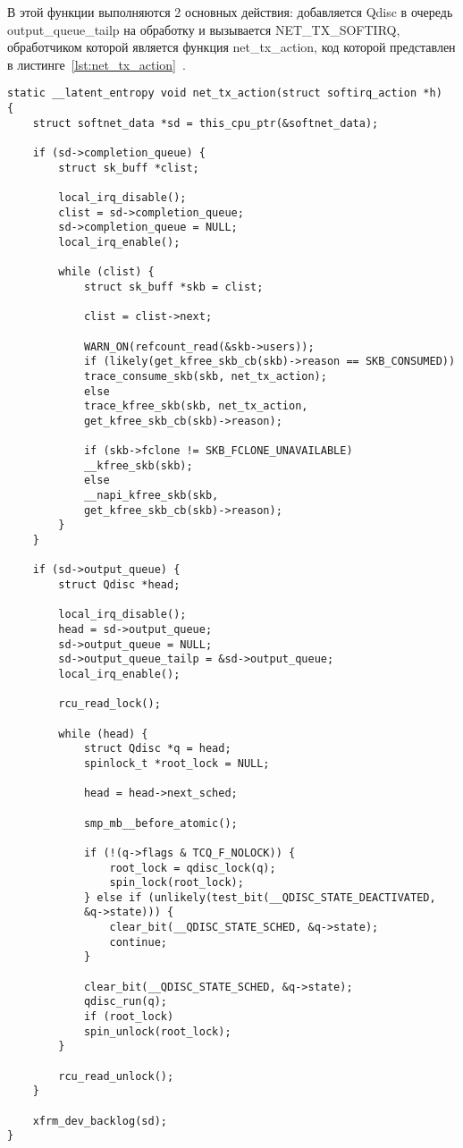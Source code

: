 В этой функции выполняются 2 основных действия: добавляется Qdisc в очередь output\_queue\_tailp на обработку и вызывается NET\_TX\_SOFTIRQ, обработчиком которой является функция net\_tx\_action, код которой представлен в листинге~\ref{lst:net_tx_action}~\cite{net_tx_action}.
\begin{center}
	\captionsetup{justification=raggedright,singlelinecheck=off}
	\begin{lstlisting}[label=lst:net_tx_action,caption=Функция net\_tx\_action,showstringspaces=false]
static __latent_entropy void net_tx_action(struct softirq_action *h)
{
	struct softnet_data *sd = this_cpu_ptr(&softnet_data);
	
	if (sd->completion_queue) {
		struct sk_buff *clist;
		
		local_irq_disable();
		clist = sd->completion_queue;
		sd->completion_queue = NULL;
		local_irq_enable();
		
		while (clist) {
			struct sk_buff *skb = clist;
			
			clist = clist->next;
			
			WARN_ON(refcount_read(&skb->users));
			if (likely(get_kfree_skb_cb(skb)->reason == SKB_CONSUMED))
			trace_consume_skb(skb, net_tx_action);
			else
			trace_kfree_skb(skb, net_tx_action,
			get_kfree_skb_cb(skb)->reason);
			
			if (skb->fclone != SKB_FCLONE_UNAVAILABLE)
			__kfree_skb(skb);
			else
			__napi_kfree_skb(skb,
			get_kfree_skb_cb(skb)->reason);
		}
	}
	
	if (sd->output_queue) {
		struct Qdisc *head;
		
		local_irq_disable();
		head = sd->output_queue;
		sd->output_queue = NULL;
		sd->output_queue_tailp = &sd->output_queue;
		local_irq_enable();
		
		rcu_read_lock();
		
		while (head) {
			struct Qdisc *q = head;
			spinlock_t *root_lock = NULL;
			
			head = head->next_sched;
			
			smp_mb__before_atomic();
			
			if (!(q->flags & TCQ_F_NOLOCK)) {
				root_lock = qdisc_lock(q);
				spin_lock(root_lock);
			} else if (unlikely(test_bit(__QDISC_STATE_DEACTIVATED,
			&q->state))) {
				clear_bit(__QDISC_STATE_SCHED, &q->state);
				continue;
			}
			
			clear_bit(__QDISC_STATE_SCHED, &q->state);
			qdisc_run(q);
			if (root_lock)
			spin_unlock(root_lock);
		}
		
		rcu_read_unlock();
	}
	
	xfrm_dev_backlog(sd);
}
	\end{lstlisting}
\end{center}
\FloatBarrier

